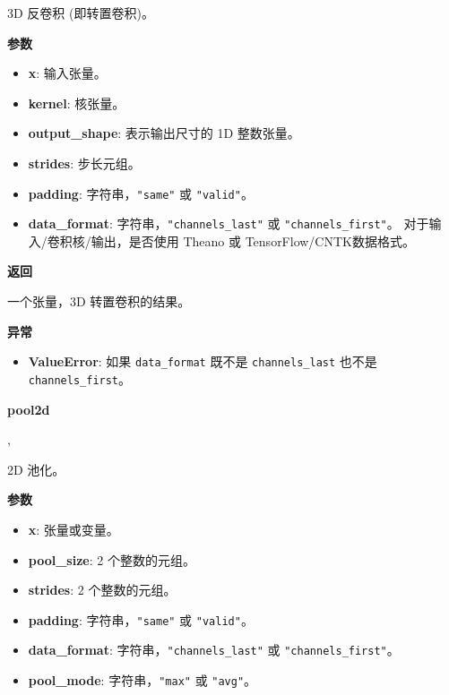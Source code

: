3D 反卷积 (即转置卷积)。

\textbf{参数}

\begin{itemize}
\tightlist
\item
  \textbf{x}: 输入张量。
\item
  \textbf{kernel}: 核张量。
\item
  \textbf{output\_shape}: 表示输出尺寸的 1D 整数张量。
\item
  \textbf{strides}: 步长元组。
\item
  \textbf{padding}: 字符串，\texttt{"same"} 或 \texttt{"valid"}。
\item
  \textbf{data\_format}: 字符串，\texttt{"channels\_last"} 或
  \texttt{"channels\_first"}。 对于输入/卷积核/输出，是否使用 Theano 或
  TensorFlow/CNTK数据格式。
\end{itemize}

\textbf{返回}

一个张量，3D 转置卷积的结果。

\textbf{异常}

\begin{itemize}
\tightlist
\item
  \textbf{ValueError}: 如果 \texttt{data\_format} 既不是
  \texttt{channels\_last} 也不是 \texttt{channels\_first}。
\end{itemize}


\textbf{pool2d}\label{pool2d}

\begin{Shaded}
\begin{Highlighting}[]
\OperatorTok{=}\NormalTok{(}\NormalTok{, }\OperatorTok{=},\\
\hspace{3cm}\OperatorTok{=}\OperatorTok{=}\NormalTok{)}
\end{Highlighting}
\end{Shaded}

2D 池化。

\textbf{参数}

\begin{itemize}
\tightlist
\item
  \textbf{x}: 张量或变量。
\item
  \textbf{pool\_size}: 2 个整数的元组。
\item
  \textbf{strides}: 2 个整数的元组。
\item
  \textbf{padding}: 字符串，\texttt{"same"} 或 \texttt{"valid"}。
\item
  \textbf{data\_format}: 字符串，\texttt{"channels\_last"} 或
  \texttt{"channels\_first"}。
\item
  \textbf{pool\_mode}: 字符串，\texttt{"max"} 或 \texttt{"avg"}。
\end{itemize}


